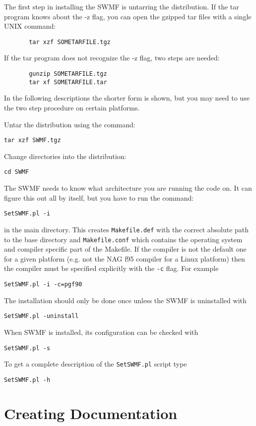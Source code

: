 The first step in installing the SWMF is untarring the distribution.
If the tar program knows about the -z flag, you can open the gzipped
tar files with a single UNIX command:
\begin{verbatim}
       tar xzf SOMETARFILE.tgz
\end{verbatim}
If the tar program does not recognize the -z flag, two steps are needed:
\begin{verbatim}
       gunzip SOMETARFILE.tgz
       tar xf SOMETARFILE.tar
\end{verbatim}
In the following descriptions the shorter form is shown, but you may
need to use the two step procedure on certain platforms.

Untar the distribution using the command:
\begin{verbatim}
tar xzf SWMF.tgz
\end{verbatim}

Change directories into the distribution:
\begin{verbatim}
cd SWMF
\end{verbatim}

The SWMF needs to know what architecture you are running the code on.
It can figure this out all by itself, but you have to run the command:
\begin{verbatim}
SetSWMF.pl -i
\end{verbatim}
in the main directory. This creates {\tt Makefile.def} with
the correct absolute path to the base directory and {\tt Makefile.conf}
which contains the operating system and compiler specific part of
the Makefile. If the compiler is not the default one for a given
platform (e.g. not the NAG f95 compiler for a Linux platform) then
the compiler must be specified explicitly with the {\tt -c}
flag. For example
\begin{verbatim}
SetSWMF.pl -i -c=pgf90
\end{verbatim}
The installation should only be done once unless the SWMF is uninstalled with
\begin{verbatim}
SetSWMF.pl -uninstall
\end{verbatim}
When SWMF is installed, its configuration can be checked with
\begin{verbatim}
SetSWMF.pl -s
\end{verbatim}
To get a complete description of the {\tt SetSWMF.pl}  script type
\begin{verbatim}
SetSWMF.pl -h
\end{verbatim}

\section{Creating Documentation}

